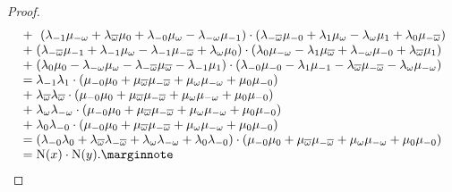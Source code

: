 \begin{proof}
\begin{equation*}
\begin{array}{r@{\;}c@{\;}l}
			&+& \  (\lambda_{-1} \mu_{-\omega} + \lambda_{\bar{\omega}} \mu_0 + 
			\lambda_{-0} \mu_{\omega} - \lambda_{-\omega} \mu_{-1}) \cdot
			(\lambda_{-\bar{\omega}} \mu_{-0} + \lambda_1 \mu_{\omega} - 
				\lambda_{\omega} \mu_1 + 
				\lambda_0 \mu_{-\bar{\omega}})  \\
				
			&+  &  (\lambda_{-\bar{\omega}} \mu_{-1} + \lambda_{-1} \mu_{\omega} - 
						\lambda_{-1} \mu_{-\bar{\omega}} + \lambda_{\omega} \mu_0)\cdot
					(\lambda_0 \mu_{-\omega} - \lambda_1 \mu_{\bar{\omega}} + \lambda_{-\omega}
			\mu_{-0} + \lambda_{\bar{\omega}} \mu_1) \\
			
			& + &  (\lambda_0 \mu_0 - \lambda_{-\omega} \mu_{\omega} - 
				\lambda_{-\bar{\omega}} \mu_{\bar{\omega}} - \lambda_{-1} \mu_1)\cdot
				(\lambda_{-0} \mu_{-0} - \lambda_1 \mu_{-1} - 
	\lambda_{\bar{\omega}} \mu_{-\bar{\omega}}-\lambda_{\omega}\mu_{-\omega}) \\ 

			& = & \lambda_{-1} \lambda_1 \cdot (\mu_{-0} \mu_0 + \mu_{\bar{\omega}} 
			\mu_{-\bar{\omega}} + \mu_{\omega} \mu_{-\omega} + \mu_{0} \mu_{-0}) \\
			
			& + &  \lambda_{\bar{\omega}} \lambda_{\bar{\omega}} \cdot
			(\mu_{-0} \mu_0 + \mu_{\bar{\omega}} \mu_{-\bar{\omega}} + \mu_{\omega} \mu_{-\omega}
		+ \mu_{0} \mu_{-0}) \\
		
			& + &  \lambda_{\omega} \lambda_{-\omega} \cdot (\mu_{-0} \mu_0 + \mu_{\bar{\omega}} 
			\mu_{-\bar{\omega}} + \mu_{\omega} \mu_{-\omega} + \mu_{0} \mu_{-0}) \\
			
			& + &  \lambda_{0} \lambda_{-0} \cdot (\mu_{-0} \mu_0 + \mu_{\bar{\omega}} 
			\mu_{-\bar{\omega}} + \mu_{\omega} \mu_{-\omega} + \mu_{0} \mu_{-0}) \\
			
			& = & (\lambda_{-0} \lambda_0 + \lambda_{\bar{\omega}} \lambda_{-\bar{\omega}} +
			 \lambda_{\omega} \lambda_{-\omega} + \lambda_{0} \lambda_{-0})\cdot
			 (\mu_{-0} \mu_0 + \mu_{\bar{\omega}} \mu_{-\bar{\omega}} + \mu_{\omega} \mu_{-\omega}
			 + \mu_{0} \mu_{-0}) \\
			 
			& = & \NN(x) \cdot \NN(y). \marginqed
		\end{array}
	\end{equation*}
	\let\qed\relax
\end{proof}
